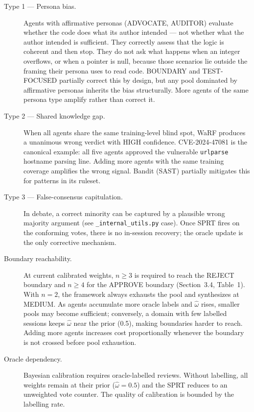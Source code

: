 \documentclass[11pt,a4paper]{article}
\begin{document}
\begin{description}
\item[Type 1 — Persona bias.]
  Agents with affirmative personas (ADVOCATE, AUDITOR) evaluate whether the
  code does what its author intended — not whether what the author intended is
  sufficient. They correctly assess that the logic is coherent and then stop.
  They do not ask what happens when an integer overflows, or when a pointer is
  null, because those scenarios lie outside the framing their persona uses to
  read code. BOUNDARY and TEST-FOCUSED partially correct this by design, but
  any pool dominated by affirmative personas inherits the bias structurally.
  More agents of the same persona type amplify rather than correct it.

\item[Type 2 — Shared knowledge gap.]
  When all agents share the same training-level blind spot, WaRF produces
  a unanimous wrong verdict with HIGH confidence. CVE-2024-47081 is the
  canonical example: all five agents approved the vulnerable \texttt{urlparse}
  hostname parsing line. Adding more agents with the same training coverage
  amplifies the wrong signal. Bandit (SAST) partially mitigates this for
  patterns in its ruleset.

\item[Type 3 — False-consensus capitulation.]
  In debate, a correct minority can be captured by a plausible wrong majority
  argument (see \texttt{\_internal\_utils.py} case). Once SPRT fires on the
  conforming votes, there is no in-session recovery; the oracle update is the
  only corrective mechanism.

\item[Boundary reachability.]
  At current calibrated weights, $n \geq 3$ is required to reach the REJECT
  boundary and $n \geq 4$ for the APPROVE boundary (Section~3.4, Table~1).
  With $n=2$, the framework always exhausts the pool and synthesizes at
  MEDIUM. As agents accumulate more oracle labels and $\hat\omega$ rises,
  smaller pools may become sufficient; conversely, a domain with few labelled
  sessions keeps $\hat\omega$ near the prior (0.5), making boundaries harder
  to reach. Adding more agents increases cost proportionally whenever the
  boundary is not crossed before pool exhaustion.

\item[Oracle dependency.]
  Bayesian calibration requires oracle-labelled reviews. Without labelling,
  all weights remain at their prior ($\hat\omega = 0.5$) and the SPRT
  reduces to an unweighted vote counter. The quality of calibration is bounded
  by the labelling rate.
\end{description}
\end{document}
